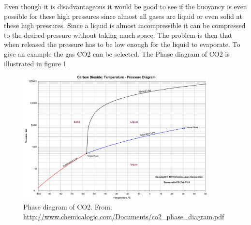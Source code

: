 \noindent 
Even though it is disadvantageous it would be good to see if the buoyancy is even possible for these high pressures since almost all gases are liquid or even solid at these high pressures. Since a liquid is almost incompressible it can be compressed to the desired pressure without taking much space. The problem is then that when released the pressure has to be low enough for the liquid to evaporate. To give an example the gas CO2 can be selected. The Phase diagram of CO2 is illustrated in figure \ref{fig:CO2phase}
\begin{figure}[htb]
\centering
\includegraphics[width=0.9\textwidth]{figures/Ricardo/co2_phase_diagram}\caption{Phase diagram of CO2. From: \url{http://www.chemicalogic.com/Documents/co2_phase_diagram.pdf}}
\label{fig:CO2phase}
\end{figure}
